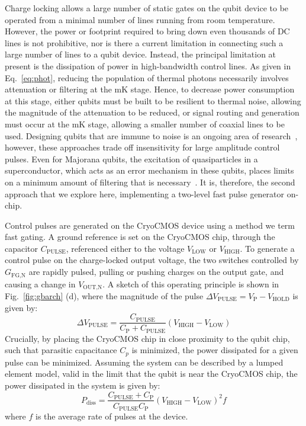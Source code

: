 Charge locking allows a large number of static gates on the qubit device to be operated from a minimal number of lines running from room temperature. However, the power or footprint required to bring down even thousands of DC lines is not prohibitive, nor is there a current limitation in connecting such a large number of lines to a qubit device. Instead, the principal limitation at present is the dissipation of power in high-bandwidth control lines. As given in Eq.~\ref{eq:phot}, reducing the population of thermal photons necessarily involves attenuation or filtering at the mK stage. Hence, to decrease power consumption at this stage, either qubits must be built to be resilient to thermal noise, allowing
the magnitude of the attenuation to be reduced, or signal routing and generation must occur at the mK stage, allowing a smaller number of coaxial lines to be used. Designing qubits
that are immune to noise is an ongoing area of research~\cite{PhysRevB.93.121410,PhysRevLett.121.177701,PhysRevB.97.155402}, however, these approaches trade off insensitivity for large amplitude control pulses. Even for Majorana qubits, the excitation of quasiparticles in a superconductor, which acts as an error mechanism in these qubits, places limits on a minimum amount of filtering that is necessary~\cite{PhysRevLett.106.167004}. It is, therefore, the second approach that we explore here, implementing a two-level
fast pulse generator on-chip.

Control pulses are generated on the CryoCMOS device using a method we term fast gating. A ground reference is set on the CryoCMOS chip, through the capacitor $C_\textrm{PULSE}$, referenced
either to the voltage $V_\textrm{LOW}$ or $V_\textrm{HIGH}$. To generate a control pulse on the charge-locked output voltage, the two switches controlled by $G_\textrm{FG,N}$ are rapidly pulsed,
pulling or pushing charges on the output gate, and causing a change in $V_\textrm{OUT,N}$. A sketch of this operating principle is shown in Fig.~\ref{fig:gbarch} (d), where the magnitude of the pulse $\Delta V_\textrm{PULSE} = V_\textrm{P} - V_\textrm{HOLD}$ is given by:
\begin{equation}
  \Delta V_\textrm{PULSE} = \frac{C_\textrm{PULSE}}{C_\textrm{P} + C_\textrm{PULSE}} (V_\textrm{HIGH} - V_\textrm{LOW})
\end{equation}
Crucially, by placing the CryoCMOS chip in close proximity to the qubit chip, such that parasitic capacitance $C_p$ is minimized, the power dissipated for a given pulse can be minimized.
Assuming the system can be described by a lumped element model, valid in the limit that the qubit is near the CryoCMOS chip, the power dissipated in the system is given by:
\begin{equation}
  P_\textrm{diss} = \frac{C_\textrm{PULSE} + C_\textrm{P}}{C_\textrm{PULSE}C_\textrm{P}} \left(V_\textrm{HIGH} - V_\textrm{LOW}\right)^2 f
  \label{eq:diss}
\end{equation}
where $f$ is the average rate of pulses at the device.

